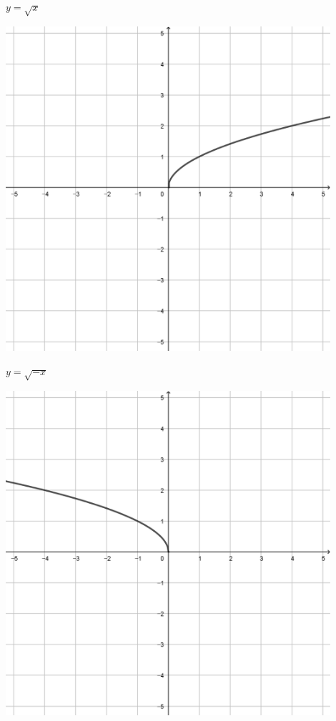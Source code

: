 \documentclass[a4paper]{oblivoir}
\begin{document}
\clearpage
\begin{minipage}{0.45\textwidth}\centering
\(y=\sqrt x\)
\par\bigskip\includegraphics[width=0.9\textwidth]{img/22-1}
\end{minipage}
\begin{minipage}{0.45\textwidth}\centering
\(y=\sqrt{-x}\)
\par\bigskip\includegraphics[width=0.9\textwidth]{img/22-2}
\end{minipage}\bigskip\bigskip\par
\end{document}
